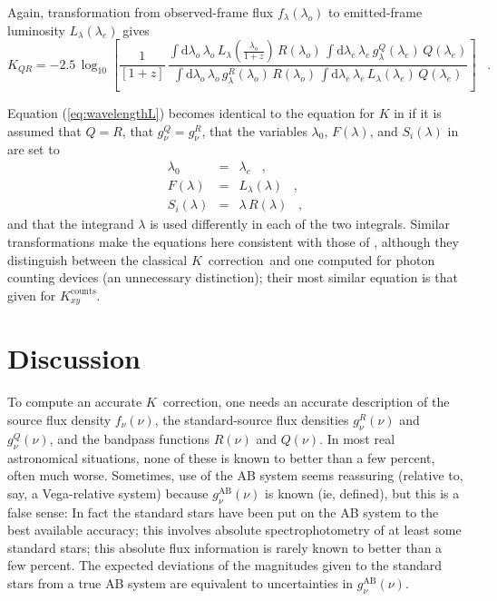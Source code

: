 \documentclass[preprint]{aastex}
\newcommand{\kcorrection}{$K$~correction}
\newcommand{\lambdaobs}{\lambda_o}
\newcommand{\lambdaemit}{\lambda_e}
\begin{document}
Again, transformation from observed-frame flux
$f_{\lambda}(\lambdaobs)$ to emitted-frame luminosity
$L_{\lambda}(\lambdaemit)$ gives
\begin{equation}
\label{eq:wavelengthL}
K_{QR} = -2.5\,\log_{10}\left[\frac{1}{[1+z]}\,
  \frac{\displaystyle
  \int\mathrm{d}\lambdaobs\,\lambdaobs\,L_{\lambda}\!\left(\frac{\lambdaobs}{1+z}\right)\,R(\lambdaobs)\,
    \int\mathrm{d}\lambdaemit\,\lambdaemit\,
    g^Q_{\lambda}(\lambdaemit)\,Q(\lambdaemit)}
       {\displaystyle
  \int\mathrm{d}\lambdaobs\,\lambdaobs\,g^R_{\lambda}(\lambdaobs)\,R(\lambdaobs)\,
    \int\mathrm{d}\lambdaemit\,\lambdaemit\,
    L_{\lambda}(\lambdaemit)\,Q(\lambdaemit)}
\right] \;\;\;.
\end{equation}

Equation (\ref{eq:wavelengthL}) becomes identical to the equation for
$K$ in \citet{oke68a} if it is assumed that $Q=R$, that
$g^Q_{\nu}=g^R_{\nu}$, that the variables $\lambda_0$,
$F(\lambda)$, and $S_i(\lambda)$ in \citet{oke68a} are set to
\begin{eqnarray}\displaystyle
\lambda_0 & = & \lambdaemit \;\;\;, \nonumber \\
F(\lambda) & = & L_{\lambda}(\lambda) \;\;\;, \nonumber \\
S_i(\lambda) & = & \lambda\,R(\lambda) \;\;\;,
\end{eqnarray}
and that the integrand $\lambda$ is used differently in each of the
two integrals.  Similar transformations make the equations here
consistent with those of \citet{kim96a}, although they distinguish
between the classical \kcorrection\ and one computed for photon
counting devices (an unnecessary distinction); their most similar
equation is that given for $K^\mathrm{counts}_{xy}$.

\section{Discussion}

To compute an accurate \kcorrection, one needs an accurate description
of the source flux density $f_{\nu}(\nu)$, the standard-source flux
densities $g^R_{\nu}(\nu)$ and $g^Q_{\nu}(\nu)$, and the bandpass
functions $R(\nu)$ and $Q(\nu)$.  In most real astronomical
situations, none of these is known to better than a few percent, often
much worse.  Sometimes, use of the AB system seems reassuring
(relative to, say, a Vega-relative system) because
$g^\mathrm{AB}_{\nu}(\nu)$ is known (ie, defined), but this is a false
sense: In fact the standard stars have been put on the AB system to
the best available accuracy; this involves absolute spectrophotometry
of at least some standard stars; this absolute flux information is
rarely known to better than a few percent.  The expected deviations of
the magnitudes given to the standard stars from a true AB system are
equivalent to uncertainties in $g^\mathrm{AB}_{\nu}(\nu)$.
\end{document}
